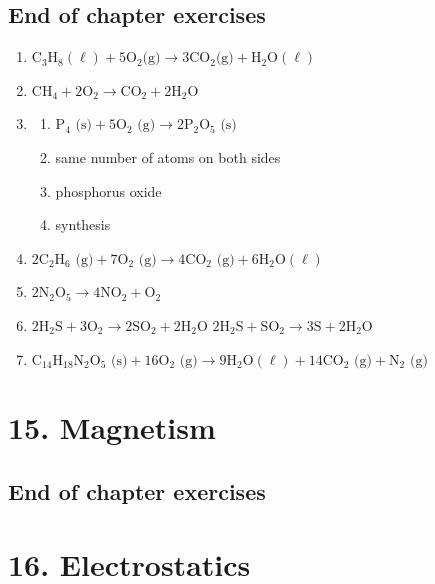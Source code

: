 \subsection{End of chapter exercises}
\begin{multicols}{2}
 \begin{enumerate}[noitemsep, label=\textbf{(\arabic*)} ]
\item ${\text{C}}_{3}{\text{H}}_{8} (\ell) + 5\text{O}_{2} \text{(g)} \to 3\text{CO}_{2} \text{(g)} + \text{H}_{2}\text{O} (\ell)$
\item $\text{CH}_{4} + 2\text{O}_{2} \to \text{CO}_{2} + 2\text{H}_{2}\text{O}$
\item 
 \begin{enumerate}[noitemsep, label=\textbf{(\alph*)} ]
\item $\text{P}_{4} \text{ (s)} + 5\text{O}_{2} \text{ (g)} \to 2\text{P}_{2}\text{O}_{5} \text{ (s)}$
\item same number of atoms on both sides
\item phosphorus oxide
\item synthesis
\end{enumerate}
\item $2\text{C}_{2}\text{H}_{6} \text{ (g)} + 7\text{O}_{2} \text{ (g)} \to 4\text{CO}_{2} \text{ (g)} + 6\text{H}_{2} \text{O} (\ell)$
\item $2\text{N}_{2}\text{O}_{5} \to 4\text{NO}_{2} + \text{O}_{2}$
\item $2\text{H}_{2}\text{S} + 3\text{O}_{2} \to 2\text{SO}_{2} + 2\text{H}_{2}\text{O}$ $2\text{H}_{2}\text{S} + \text{SO}_{2} \to 3\text{S} + 2\text{H}_{2}\text{O}$
\item $\text{C}_{14}\text{H}_{18}\text{N}_{2}\text{O}_{5} \text{ (s)} + 16\text{O}_{2} \text{ (g)} \to 9\text{H}_{2} \text{O} (\ell) + 14\text{CO}_{2} \text{ (g)} + \text{N}_{2} \text{ (g)}$
 \end{enumerate}
\end{multicols}

\section{15. Magnetism}
\subsection{End of chapter exercises}
\section{16. Electrostatics}
